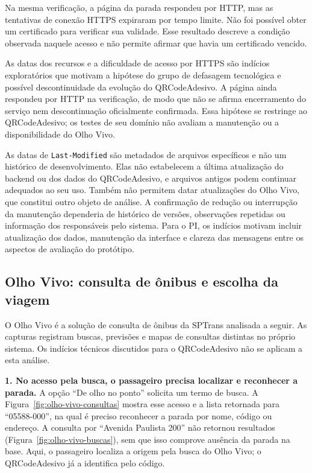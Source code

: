 \documentclass[12pt,oneside,a4paper,brazil]{abntex2}
\begin{document}
Na mesma verificação, a página da parada respondeu por HTTP, mas as tentativas de conexão HTTPS expiraram por tempo limite. Não foi possível obter um certificado para verificar sua validade. Esse resultado descreve a condição observada naquele acesso e não permite afirmar que havia um certificado vencido.

As datas dos recursos e a dificuldade de acesso por HTTPS são indícios exploratórios que motivam a hipótese do grupo de defasagem tecnológica e possível descontinuidade da evolução do QRCodeAdesivo. A página ainda respondeu por HTTP na verificação, de modo que não se afirma encerramento do serviço nem descontinuação oficialmente confirmada. Essa hipótese se restringe ao QRCodeAdesivo; os testes de seu domínio não avaliam a manutenção ou a disponibilidade do Olho Vivo.

As datas de \texttt{Last-Modified} são metadados de arquivos específicos e não um histórico de desenvolvimento. Elas não estabelecem a última atualização do backend ou dos dados do QRCodeAdesivo, e arquivos antigos podem continuar adequados ao seu uso. Também não permitem datar atualizações do Olho Vivo, que constitui outro objeto de análise. A confirmação de redução ou interrupção da manutenção dependeria de histórico de versões, observações repetidas ou informação dos responsáveis pelo sistema. Para o PI, os indícios motivam incluir atualização dos dados, manutenção da interface e clareza das mensagens entre os aspectos de avaliação do protótipo.


\clearpage
\subsection{Olho Vivo: consulta de ônibus e escolha da viagem}
\label{sec:analise-olhovivo}
O Olho Vivo é a solução de consulta de ônibus da SPTrans analisada a seguir. As capturas registram buscas, previsões e mapas de consultas distintas no próprio sistema. Os indícios técnicos discutidos para o QRCodeAdesivo não se aplicam a esta análise.

\textbf{1. No acesso pela busca, o passageiro precisa localizar e reconhecer a parada.}
A opção ``De olho no ponto'' solicita um termo de busca. A Figura~\ref{fig:olho-vivo-consultas} mostra esse acesso e a lista retornada para ``05588-000'', na qual é preciso reconhecer a parada por nome, código ou endereço. A consulta por ``Avenida Paulista 200'' não retornou resultados (Figura~\ref{fig:olho-vivo-buscas}), sem que isso comprove ausência da parada na base. Aqui, o passageiro localiza a origem pela busca do Olho Vivo; o QRCodeAdesivo já a identifica pelo código.
\end{document}
